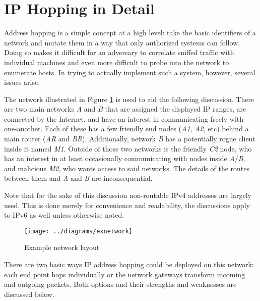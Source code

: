 
\section{IP Hopping in Detail}
\label{sec:hopping}
\par Address hopping is a simple concept at a high level: take the basic identifiers of a network and mutate them in a way that only authorized systems can follow. Doing so makes it difficult for an adversary to correlate sniffed traffic with individual machines and even more difficult to probe into the network to enumerate hosts. In trying to actually implement such a system, however, several issues arise. 

\par {} The network illustrated in Figure \ref{fig:exnetwork} is used to aid the following discussion. There are two main networks \textit{A} and \textit{B} that are assigned the displayed IP ranges, are connected by the Internet, and have an interest in communicating freely with one-another. Each of these has a few friendly end nodes (\textit{A1}, \textit{A2}, etc) behind a main router (\textit{AR} and \textit{BR}). Additionally, network \textit{B} has a potentially rogue client inside it named \textit{M1}. Outside of those two networks is the friendly \textit{C2} node, who has an interest in at least occasionally communicating with nodes inside \textit{A}/\textit{B}, and malicious \textit{M2}, who wants access to said networks. The details of the routes between them and \textit{A} and \textit{B} are inconsequential.

\par Note that for the sake of this discussion non-routable \ac{IPv4} addresses are largely used. This is done merely for convenience and readability, the discussions apply to \ac{IPv6} as well unless otherwise noted.

\begin{figure}
	\centering
	\texttt{[image: ../diagrams/exnetwork]}
	\caption{Example network layout }
	\label{fig:exnetwork}
\end{figure}

\par There are two basic ways IP address hopping could be deployed on this network: each end point hops individually or the network gateways transform incoming and outgoing packets. Both options and their strengths and weaknesses are discussed below.

